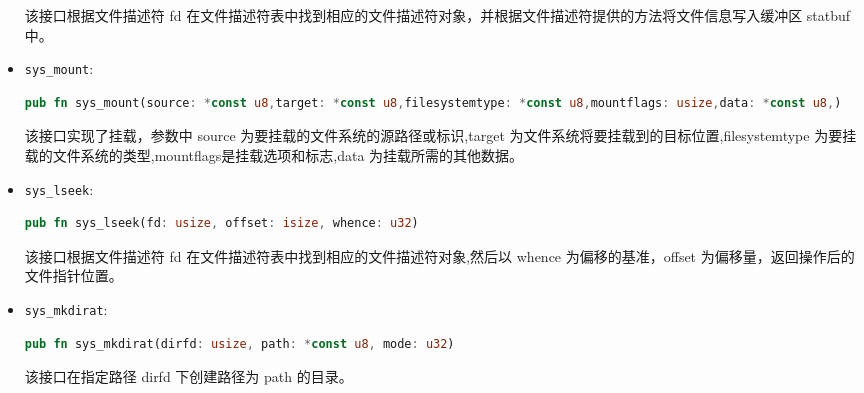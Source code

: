 \begin{itemize}
	该接口根据文件描述符 fd 在文件描述符表中找到相应的文件描述符对象，并根据文件描述符提供的方法将文件信息写入缓冲区 statbuf 中。
	\item \texttt{sys\_mount}: 
	\begin{lstlisting}[language=rust]
		pub fn sys_mount(source: *const u8,target: *const u8,filesystemtype: *const u8,mountflags: usize,data: *const u8,)
	\end{lstlisting}
	该接口实现了挂载，参数中 source 为要挂载的文件系统的源路径或标识,target 为文件系统将要挂载到的目标位置,filesystemtype 为要挂载的文件系统的类型,mountflags是挂载选项和标志,data 为挂载所需的其他数据。
	\item \texttt{sys\_lseek}: 
	\begin{lstlisting}[language=rust]
		pub fn sys_lseek(fd: usize, offset: isize, whence: u32)
	\end{lstlisting}
	该接口根据文件描述符 fd 在文件描述符表中找到相应的文件描述符对象,然后以 whence 为偏移的基准，offset 为偏移量，返回操作后的文件指针位置。
	\item \texttt{sys\_mkdirat}: 
	\begin{lstlisting}[language=rust]
		pub fn sys_mkdirat(dirfd: usize, path: *const u8, mode: u32)
	\end{lstlisting}
	该接口在指定路径 dirfd 下创建路径为 path 的目录。
\end{itemize}